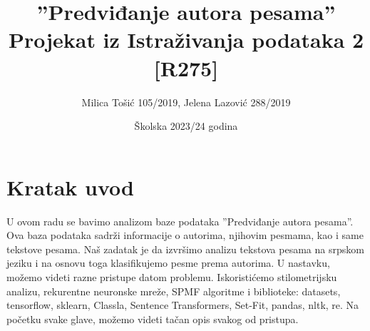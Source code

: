 \documentclass{article}
\title{\textbf{”Predviđanje autora pesama”} \\Projekat iz Istraživanja podataka 2 
[R275]}
\author{Milica Tošić 105/2019, Jelena Lazović 288/2019}
\date{Školska 2023/24 godina}
\begin{document}
\maketitle


\begin{titlepage}
    \centering
    \vfill
    \maketitle
    \vfill
    \vfill
    \vfill
    \vfill
    \vfill
\end{titlepage}

\newpage


\renewcommand{\contentsname}{Sadržaj}

\tableofcontents

\newpage


\section{Kratak uvod}

\begin{flushleft}

U ovom radu se bavimo analizom baze podataka ”Predviđanje autora pesama”.
Ova baza podataka sadrži informacije o autorima, njihovim pesmama, kao i same 
tekstove pesama. Naš zadatak je da izvršimo analizu tekstova pesama na srpskom 
jeziku i na osnovu toga klasifikujemo pesme prema autorima. U nastavku, možemo 
videti razne pristupe datom problemu. Iskoristićemo stilometrijsku analizu, 
rekurentne neuronske mreže, SPMF algoritme i biblioteke: datasets, tensorflow, sklearn, Classla, 
Sentence Transformers, Set-Fit, pandas, nltk, re. Na početku svake glave, možemo 
videti tačan opis svakog od pristupa.

\end{flushleft}
\end{document}
